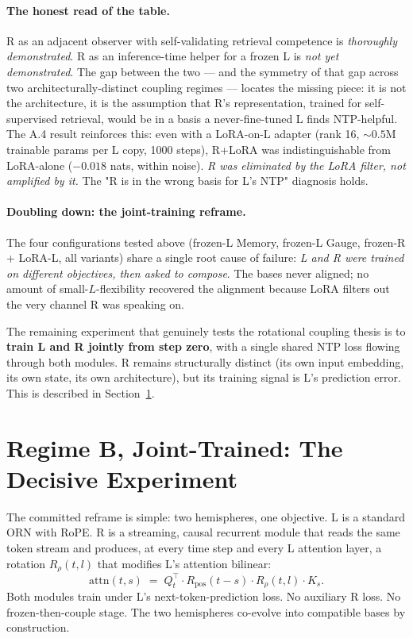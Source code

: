 \documentclass[10pt, twocolumn, a4paper]{article}
\begin{document}
\paragraph{The honest read of the table.} R as an adjacent observer with self-validating retrieval competence is \emph{thoroughly demonstrated}. R as an inference-time helper for a frozen L is \emph{not yet demonstrated}. The gap between the two --- and the symmetry of that gap across two architecturally-distinct coupling regimes --- locates the missing piece: it is not the architecture, it is the assumption that R's representation, trained for self-supervised retrieval, would be in a basis a never-fine-tuned L finds NTP-helpful. The A.4 result reinforces this: even with a LoRA-on-L adapter (rank 16, $\sim 0.5$M trainable params per L copy, 1000 steps), R+LoRA was indistinguishable from LoRA-alone ($-0.018$ nats, within noise). \emph{R was eliminated by the LoRA filter, not amplified by it.} The "R is in the wrong basis for L's NTP" diagnosis holds.

\paragraph{Doubling down: the joint-training reframe.} The four configurations tested above (frozen-L Memory, frozen-L Gauge, frozen-R + LoRA-L, all variants) share a single root cause of failure: \emph{L and R were trained on different objectives, then asked to compose}. The bases never aligned; no amount of small-$L$-flexibility recovered the alignment because LoRA filters out the very channel R was speaking on.

The remaining experiment that genuinely tests the rotational coupling thesis is to \textbf{train L and R jointly from step zero}, with a single shared NTP loss flowing through both modules. R remains structurally distinct (its own input embedding, its own state, its own architecture), but its training signal is L's prediction error. This is described in Section~\ref{sec:joint_training}.


\section{Regime B, Joint-Trained: The Decisive Experiment}
\label{sec:joint_training}

The committed reframe is simple: two hemispheres, one objective. L is a standard ORN with RoPE. R is a streaming, causal recurrent module that reads the same token stream and produces, at every time step and every L attention layer, a rotation $R_\rho(t, l)$ that modifies L's attention bilinear:
\[
\text{attn}(t, s) \;=\; Q_t^\top \cdot R_{\text{pos}}(t-s) \cdot R_\rho(t, l) \cdot K_s.
\]
Both modules train under L's next-token-prediction loss. No auxiliary R loss. No frozen-then-couple stage. The two hemispheres co-evolve into compatible bases by construction.
\end{document}
